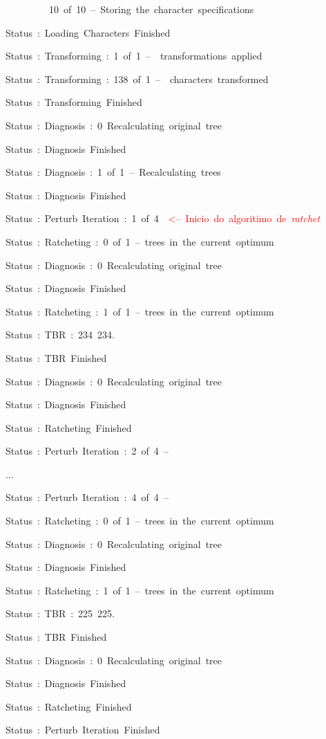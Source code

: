 \begin{refsection}
~~~~~~~~~10~of~10~--~Storing~the~character~specifications

Status~:~Loading~Characters~Finished

Status~:~Transforming~:~1~of~1~--~~transformations~applied

Status~:~Transforming~:~138~of~1~--~~characters~transformed

Status~:~Transforming~Finished

Status~:~Diagnosis~:~0~Recalculating~original~tree

Status~:~Diagnosis~Finished

Status~:~Diagnosis~:~1~of~1~--~Recalculating~trees

Status~:~Diagnosis~Finished

Status~:~Perturb~Iteration~:~1~of~4~~\textcolor{red}{<--~Inicio~do~algoritimo~de~\textit{ratchet}}

Status~:~Ratcheting~:~0~of~1~--~trees~in~the~current~optimum

Status~:~Diagnosis~:~0~Recalculating~original~tree

Status~:~Diagnosis~Finished

Status~:~Ratcheting~:~1~of~1~--~trees~in~the~current~optimum

Status~:~TBR~:~234~234.

Status~:~TBR~Finished

Status~:~Diagnosis~:~0~Recalculating~original~tree

Status~:~Diagnosis~Finished

Status~:~Ratcheting~Finished

Status~:~Perturb~Iteration~:~2~of~4~--~

...

Status~:~Perturb~Iteration~:~4~of~4~--~

Status~:~Ratcheting~:~0~of~1~--~trees~in~the~current~optimum

Status~:~Diagnosis~:~0~Recalculating~original~tree

Status~:~Diagnosis~Finished

Status~:~Ratcheting~:~1~of~1~--~trees~in~the~current~optimum

Status~:~TBR~:~225~225.

Status~:~TBR~Finished

Status~:~Diagnosis~:~0~Recalculating~original~tree

Status~:~Diagnosis~Finished

Status~:~Ratcheting~Finished

Status~:~Perturb~Iteration~Finished


\end{refsection}
